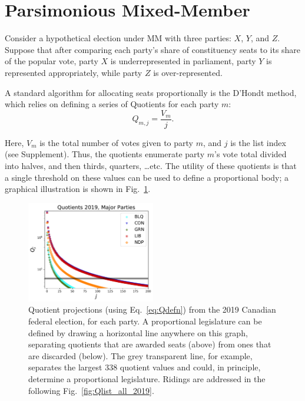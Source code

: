 \section{Parsimonious Mixed-Member}
\label{sec:model_proposal}

Consider a hypothetical election under MM with three parties: $X$, $Y$, and $Z$. Suppose that after comparing each party's share of constituency seats to its share of the popular vote, party $X$ is underrepresented in parliament, party $Y$ is represented appropriately, while party $Z$ is over-represented.

A standard algorithm for allocating seats proportionally is the D'Hondt method, which relies on defining a series of Quotients for each party $m$:
\begin{equation}
\label{eq:Qdefn}
Q_{m,j} = \frac{V_m}{j}.
\end{equation}

Here, $V_m$ is the total number of votes given to party $m$, and $j$ is the list index (see Supplement).
Thus, the quotients enumerate party $m$'s vote total divided into halves, and then thirds, quarters, \ldots etc. The utility of these quotients is that a single threshold on these values can be used to define a proportional body; a graphical illustration is shown in Fig.~\ref{fig:Qlist_byparty_2019}.


\begin{figure} %
  \includegraphics[width=0.50\textwidth,clip]{PR_calcs/data/raw_2019/PMM_out/PMM_Qlist_byparty}
  \captionsetup{format=default}
  \caption{Quotient projections (using Eq.~\ref{eq:Qdefn}) from the 2019 Canadian federal election, for each party. A proportional legislature can be defined by drawing a horizontal line anywhere on this graph, separating quotients that are awarded seats (above) from ones that are discarded (below). The grey transparent line, for example, separates the largest 338 quotient values and could, in principle, determine a proportional legislature. Ridings are addressed in the following Fig.~\ref{fig:Qlist_all_2019}. }
\label{fig:Qlist_byparty_2019}
\end{figure}

